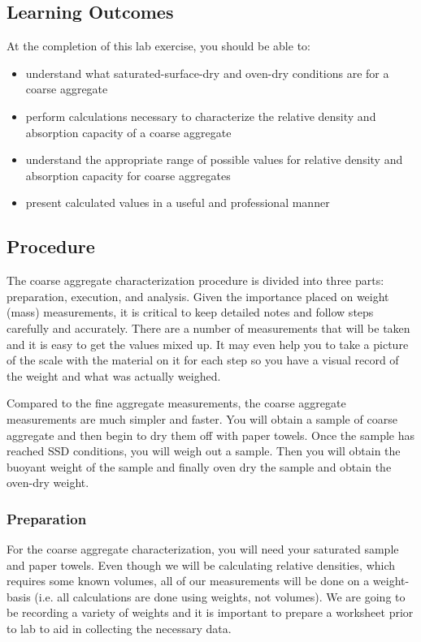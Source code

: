 \documentclass[12pt]{article}
\begin{document}
\subsection{Learning Outcomes}
At the completion of this lab exercise, you should be able to:
\begin{itemize}
    \item understand what saturated-surface-dry and oven-dry conditions are for a coarse aggregate
    \item perform calculations necessary to characterize the relative density and absorption capacity of a coarse aggregate
    \item understand the appropriate range of possible values for relative density and absorption capacity for coarse aggregates
    \item present calculated values in a useful and professional manner
\end{itemize}

\pagebreak
\subsection{Procedure}
The coarse aggregate characterization procedure is divided into three parts: preparation, execution, and analysis. Given the importance placed on weight (mass) measurements, it is critical to keep detailed notes and follow steps carefully and accurately. There are a number of measurements that will be taken and it is easy to get the values mixed up. It may even help you to take a picture of the scale with the material on it for each step so you have a visual record of the weight and what was actually weighed.

Compared to the fine aggregate measurements, the coarse aggregate measurements are much simpler and faster. You will obtain a sample of coarse aggregate and then begin to dry them off with paper towels. Once the sample has reached SSD conditions, you will weigh out a sample. Then you will obtain the buoyant weight of the sample and finally oven dry the sample and obtain the oven-dry weight.

\subsubsection{Preparation}
For the coarse aggregate characterization, you will need your saturated sample and paper towels. Even though we will be calculating relative densities, which requires some known volumes, all of our measurements will be done on a weight-basis (i.e. all calculations are done using weights, not volumes). We are going to be recording a variety of weights and it is important to prepare a worksheet prior to lab to aid in collecting the necessary data.
\end{document}
